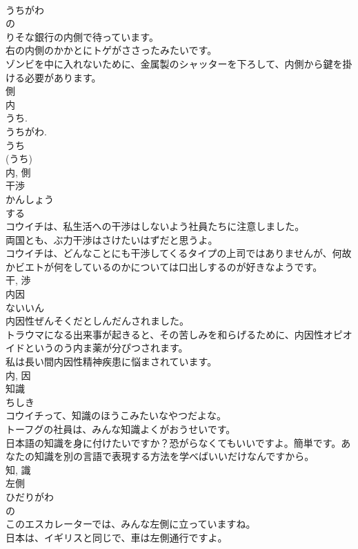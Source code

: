 \documentclass[8pt]{extreport}
\begin{document}
\begin{CJK}{UTF8}{min}
\\	うちがわ	
\\	の 
\\	りそな銀行の内側で待っています。	
\\	右の内側のかかとにトゲがささったみたいです。	
\\	ゾンビを中に入れないために、金属製のシャッターを下ろして、内側から鍵を掛ける必要があります。	
\\	側 
\\	内 
\\	うち. 
\\	うちがわ. 
\\	うち 
\\	(うち) 
\\	内, 側	
\\	干渉	
\\	かんしょう	
\\	する 
\\	コウイチは、私生活への干渉はしないよう社員たちに注意しました。	
\\	両国とも、ぶ力干渉はさけたいはずだと思うよ。	
\\	コウイチは、どんなことにも干渉してくるタイプの上司ではありませんが、何故かビエトが何をしているのかについては口出しするのが好きなようです。	
\\	干, 渉	
\\	内因	
\\	ないいん	
\\	内因性ぜんそくだとしんだんされました。	
\\	トラウマになる出来事が起きると、その苦しみを和らげるために、内因性オピオイドというのう内ま薬が分ぴつされます。	
\\	私は長い間内因性精神疾患に悩まされています。	
\\	内, 因	
\\	知識	
\\	ちしき	
\\	コウイチって、知識のほうこみたいなやつだよな。	
\\	トーフグの社員は、みんな知識よくがおうせいです。	
\\	日本語の知識を身に付けたいですか？恐がらなくてもいいですよ。簡単です。あなたの知識を別の言語で表現する方法を学べばいいだけなんですから。	
\\	知, 識	
\\	左側	
\\	ひだりがわ	
\\	の 
\\	このエスカレーターでは、みんな左側に立っていますね。	
\\	日本は、イギリスと同じで、車は左側通行ですよ。	

\end{CJK}
\end{document}
